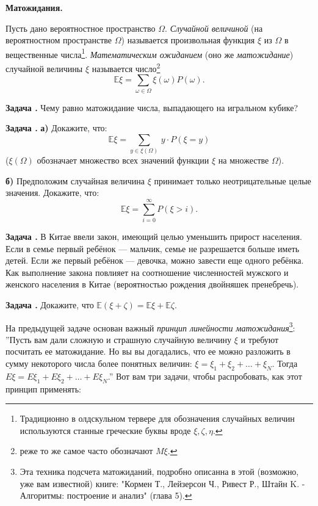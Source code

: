 \documentclass[11pt,a4paper]{article}
\def\E{\mathrm{\mathbb{E}}}
\newcounter{znum}
\newcommand{\z}[1]{\addtocounter{znum}{1} \textbf{Задача \arabic{znum}#1. }}
\renewcommand{\!}{\textcolor{red}{!}}
\begin{document}
\pagestyle{empty}

\begin{center}
	\large
	\textbf{Матожидания.}\\
\end{center}


Пусть дано вероятностное пространство $\Omega$. \emph{Случайной величиной} (на вероятностном пространстве $\Omega$) называется произвольная функция $\xi$ из $\Omega$ в вещественные числа\footnote{Традиционно в олдскульном тервере для обозначения случайных величин используются станные греческие буквы вроде $\xi, \zeta, \eta$.}. \emph{Математическим ожиданием} (оно же \emph{матожидание}) случайной величины $\xi$ называется число\footnote{реже то же самое часто обозначают $M\xi$.}
$$\E\xi = \sum_{\omega \in \Omega} \xi(\omega) P(\omega).$$

\z{} Чему равно матожидание числа, выпадающего на игральном кубике?

\z{} 
\textbf{а)} Докажите, что:
$$\E\xi = \sum_{y \in \xi(\Omega)} \, y \cdot P(\xi = y)$$
($\xi(\Omega)$ обозначает множество всех значений функции $\xi$ на множестве $\Omega$).

\textbf{б)} Предположим случайная величина $\xi$ принимает только неотрицательные целые значения. Докажите, что:
$$\E\xi = \sum_{i=0}^\infty P(\xi > i).$$

\z{} В Китае ввели закон, имеющий целью уменьшить прирост населения. Если в семье первый ребёнок — мальчик, семье не разрешается больше иметь детей. Если же первый ребёнок — девочка, можно завести еще одного ребёнка. Как выполнение закона повлияет на соотношение численностей мужского и женского населения в Китае (вероятностью рождения двойняшек пренебречь).

\z{} Докажите, что $\E(\xi + \zeta) = \E \xi + \E \zeta$.

\vspace{0.2cm}

На предыдущей задаче основан важный \emph{принцип линейности матожидания}\footnote{Эта техника подсчета матожиданий, подробно описанна в этой (возможно, уже вам известной) книге: "Кормен Т., Лейзерсон Ч., Ривест Р., Штайн K. - Алгоритмы: построение и анализ" (глава 5).}:
''Пусть вам дали сложную и страшную случайную величину $\xi$ и требуют посчитать ее матожидание. Но вы вы догадались, что ее можно разложить в сумму некоторого числа более понятных величин: $\xi = \xi_1 + \xi_2 + \ldots + \xi_N$. Тогда $E\xi = E\xi_1 + E\xi_2 + \ldots + E\xi_N$.'' Вот вам три задачи, чтобы распробовать, как этот принцип применять:
\end{document}

